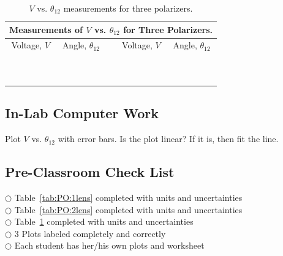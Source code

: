 \begin{table}[htb]
\begin{center}
\begin{tabular}{|c|c|c|c|c|}
\hline
\multicolumn{5}{|c|}{Measurements of $V$ vs. $\theta _{12}$ for
 Three Polarizers.} \\
\hline
Voltage, $V$ & Angle, $\theta _{12}$ & & Voltage, $V$ & Angle, $\theta _{12}$\\
\hline
\hspace*{3cm} & \hspace*{3cm} & \hspace*{.3cm} & \hspace*{3cm} & \hspace*{3cm}
\\
& & & & \\
\hline
& & & & \\
& & & & \\
\hline
& & & & \\
& & & & \\
\hline
& & & & \\
& & & & \\
\hline
& & & & \\
& & & & \\
\hline
\end{tabular}
\end{center}
\caption{$V$ vs. $\theta _{12}$ measurements for three polarizers.}
\label {tab:PO:3lens}
\end{table}

\subsection{In-Lab Computer Work}

Plot $V$ vs. $\theta_{12}$ with error bars.  Is the plot linear?  If it is, then 
fit the line. 

\subsection{Pre-Classroom Check List}
$\bigcirc$ \hspace*{1cm} Table~\ref{tab:PO:1lens} completed with units and uncertainties \\
$\bigcirc$ \hspace*{1cm} Table~\ref{tab:PO:2lens} completed with units and uncertainties \\
$\bigcirc$ \hspace*{1cm} Table~\ref{tab:PO:3lens} completed with units and uncertainties \\
$\bigcirc$ \hspace*{1cm} 3  Plots labeled completely and correctly \\
$\bigcirc$ \hspace*{1cm} Each student has her/his own plots and worksheet \\

